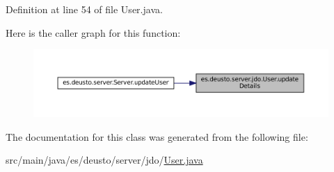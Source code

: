 Definition at line 54 of file User.\+java.

Here is the caller graph for this function\+:
\nopagebreak
\begin{figure}[H]
\begin{center}
\leavevmode
\includegraphics[width=350pt]{classes_1_1deusto_1_1server_1_1jdo_1_1_user_a2abb7df132d0ded1f4187d900416d65d_icgraph}
\end{center}
\end{figure}


The documentation for this class was generated from the following file\+:\begin{DoxyCompactItemize}
\item 
src/main/java/es/deusto/server/jdo/\mbox{\hyperlink{_user_8java}{User.\+java}}\end{DoxyCompactItemize}
